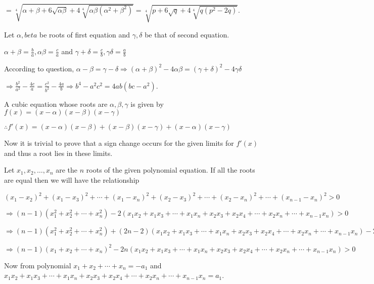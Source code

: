   $= \sqrt[4]{\alpha + \beta + 6\sqrt{\alpha\beta} + 4\sqrt[4]{\alpha\beta(\alpha^2 + \beta^2)}} =
  \sqrt[4]{p + 6\sqrt{q} + 4\sqrt[4]{q(p^2 - 2q)}}$.
\item Let $\alpha, beta$ be roots of first equation and $\gamma, \delta$ be that of second equation.

  $\alpha + \beta = \frac{b}{a}, \alpha\beta = \frac{c}{a}$ and $\gamma + \delta = \frac{c}{b},
  \gamma\delta = \frac{a}{b}$

  According to question, $\alpha - \beta = \gamma - \delta\Rightarrow (\alpha + \beta)^2 - 4\alpha\beta =
  (\gamma + \delta)^2 - 4\gamma\delta$

  $\Rightarrow \frac{b^2}{a^2} - \frac{4c}{a} = \frac{c^2}{b^2} - \frac{4a}{b}\Rightarrow b^4 - a^2c^2 =
  4ab(bc - a^2)$.
\item A cubic equation whose roots are $\alpha, \beta, \gamma$ is given by $f(x) = (x - \alpha)(x -
  \beta)(x - \gamma)$

  $\therefore f'(x) = (x - \alpha)(x - \beta) + (x - \beta)(x - \gamma) + (x - \alpha)(x - \gamma)$

  Now it is trivial to prove that a sign change occurs for the given limits for $f'(x)$ and thus a root lies
  in these limits.
\item Let $x_1, x_2, \ldots, x_n$ are the $n$ roots of the given polynomial equation. If all the roots are
  equal then we will have the relationship

  $(x_1 - x_2)^2 + (x_1 - x_3)^2 + \cdots + (x_1 - x_n)^2 + (x_2 - x_3)^2 + \cdots + (x_2 - x_n)^2 + \cdots
  + (x_{n - 1} - x_n)^2 > 0$

  $\Rightarrow (n - 1)(x_1^2 + x_2^2 + \cdots + x_n^2) - 2(x_1x_2 + x_1x_3 + \cdots + x_1x_n + x_2x_3 +
  x_2x_4 + \cdots + x_2x_n + \cdots + x_{n - 1}x_n) > 0$

  $\Rightarrow (n - 1)(x_1^2 + x_2^2 + \cdots + x_n^2) + (2n - 2)(x_1x_2 + x_1x_3 + \cdots + x_1x_n + x_2x_3 +
  x_2x_4 + \cdots + x_2x_n + \cdots + x_{n - 1}x_n) - 2n(x_1x_2 + x_1x_3 + \cdots + x_1x_n + x_2x_3 +
  x_2x_4 + \cdots + x_2x_n + \cdots + x_{n - 1}x_n) > 0$

  $\Rightarrow (n - 1)(x_1 + x_2 + \cdots + x_n)^2 - 2n(x_1x_2 + x_1x_3 + \cdots + x_1x_n + x_2x_3 +
  x_2x_4 + \cdots + x_2x_n + \cdots + x_{n - 1}x_n) > 0$

  Now from polynomial $x_1 + x_2 + \cdots + x_n = -a_1$ and $x_1x_2 + x_1x_3 + \cdots + x_1x_n + x_2x_3 +
  x_2x_4 + \cdots + x_2x_n + \cdots + x_{n - 1}x_n = a_1$.

